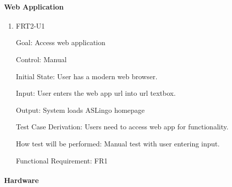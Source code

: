\documentclass[12pt, titlepage]{article}
\begin{document}
\paragraph{Web Application}

\begin{enumerate}

\item{FRT2-U1}

Goal: Access web application

Control: Manual
					
Initial State: User has a modern web browser.
					
Input: User enters the web app url into url textbox.
					
Output: System loads ASLingo homepage

Test Case Derivation: Users need to access web app for functionality.
					
How test will be performed: Manual test with user entering input.

Functional Requirement: FR1

\end{enumerate}

\paragraph{Hardware}
\end{document}
